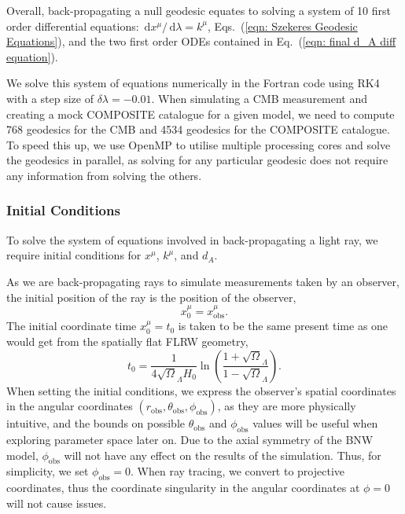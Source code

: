 \documentclass[a4paper,12pt]{report}
\newcommand{\diff}[1]{\,\text{d}{#1}}
\renewcommand{\eqref}[1]{Eq.~({#1})}
\begin{document}
Overall, back-propagating a null geodesic equates to solving a system of 10 first order differential equations: $\diff{x^\mu}/\diff{\lambda}=k^\mu$, Eqs.~(\ref{eqn: Szekeres Geodesic Equations}), and the two first order ODEs contained in \eqref{\ref{eqn: final d_A diff equation}}.

We solve this system of equations numerically in the Fortran code using RK4 with a step size of $\delta \lambda = -0.01$. When simulating a CMB measurement and creating a mock COMPOSITE catalogue for a given model, we need to compute 768 geodesics for the CMB and 4534 geodesics for the COMPOSITE catalogue. To speed this up, we use OpenMP to utilise multiple processing cores and solve the geodesics in parallel, as solving for any particular geodesic does not require any information from solving the others.

\subsubsection{Initial Conditions}
To solve the system of equations involved in back-propagating a light ray, we require initial conditions for $x^\mu$, $k^\mu$, and $d_A$.

As we are back-propagating rays to simulate measurements taken by an observer, the initial position of the ray is the position of the observer,
\begin{equation}
  x^\mu_0 = x^\mu_\text{obs}.
\end{equation}
The initial coordinate time $x^\mu_0 = t_0$ is taken to be the same present time as one would get from the spatially flat FLRW geometry,
\begin{equation}
    t_0 = \frac{1}{4\sqrt\Omega_\Lambda H_0} \ln\left(\frac{1+\sqrt\Omega_\Lambda}{1-\sqrt\Omega_\Lambda}\right).
\end{equation}
When setting the initial conditions, we express the observer's spatial coordinates in the angular coordinates $(r_\text{obs}, \theta_\text{obs}, \phi_\text{obs})$, as they are more physically intuitive, and the bounds on possible $\theta_\text{obs}$ and $\phi_\text{obs}$ values will be useful when exploring parameter space later on. Due to the axial symmetry of the BNW model, $\phi_\text{obs}$ will not have any effect on the results of the simulation. Thus, for simplicity, we set $\phi_\text{obs}=0$. When ray tracing, we convert to projective coordinates, thus the coordinate singularity in the angular coordinates at $\phi=0$ will not cause issues.
\end{document}
